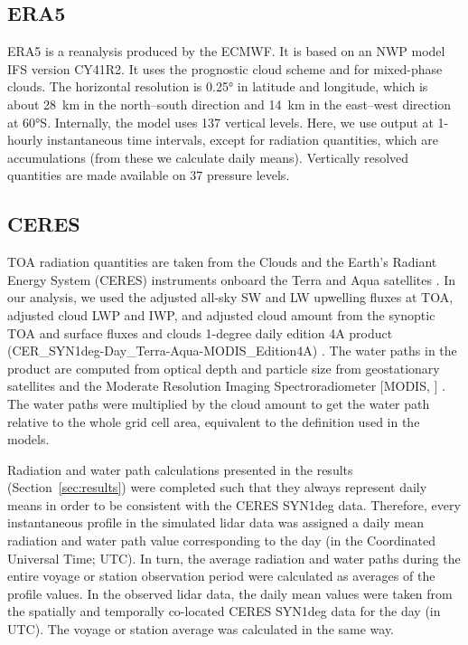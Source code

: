 \documentclass[draft]{agujournal2019}
\begin{document}
\subsection{ERA5}

ERA5 \cite{era5} is a reanalysis produced by the ECMWF. It is based on an NWP model IFS version CY41R2. It uses the  prognostic cloud scheme and  for mixed-phase clouds. The horizontal resolution is 0.25° in latitude and longitude, which is about 28~km in the north–south direction and 14~km in the east–west direction at 60°S. Internally, the model uses 137 vertical levels. Here, we use output at 1-hourly instantaneous time intervals, except for radiation quantities, which are accumulations (from these we calculate daily means). Vertically resolved quantities are made available on 37 pressure levels.

\subsection{CERES}
\label{sec:ceres}

TOA radiation quantities are taken from the Clouds and the Earth’s Radiant Energy System (CERES) instruments onboard the Terra and Aqua satellites \cite{wielicki1996,loeb2018}. In our analysis, we used the adjusted all-sky SW and LW upwelling fluxes at TOA, adjusted cloud LWP and IWP, and adjusted cloud amount from the synoptic TOA and surface fluxes and clouds 1-degree daily edition 4A product (CER\_SYN1deg-Day\_Terra-Aqua-MODIS\_Edition4A) \cite{doelling2013,doelling2016}. The water paths in the product are computed from optical depth and particle size from geostationary satellites and the Moderate Resolution Imaging Spectroradiometer [MODIS, ] \cite{ceres2025}. The water paths were multiplied by the cloud amount to get the water path relative to the whole grid cell area, equivalent to the definition used in the models.

Radiation and water path calculations presented in the results (Section~\ref{sec:results}) were completed such that they always represent daily means in order to be consistent with the CERES SYN1deg data. Therefore, every instantaneous profile in the simulated lidar data was assigned a daily mean radiation and water path value corresponding to the day (in the Coordinated Universal Time; UTC). In turn, the average radiation and water paths during the entire voyage or station observation period were calculated as averages of the profile values. In the observed lidar data, the daily mean values were taken from the spatially and temporally co-located CERES SYN1deg data for the day (in UTC). The voyage or station average was calculated in the same way.
\end{document}
